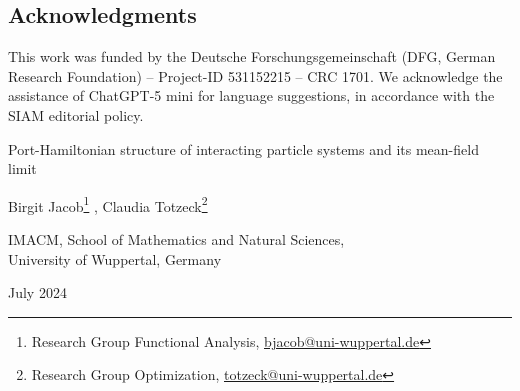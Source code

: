 \documentclass[11pt]{article}
\newcounter{partcounter}
\begin{document}
\begin{bibunit}[unsrtnat]
    \section*{Acknowledgments}
    This work was funded by the Deutsche Forschungsgemeinschaft (DFG, German Research Foundation) – Project-ID 531152215 – CRC 1701. We acknowledge the assistance of ChatGPT-5 mini for language suggestions, in accordance with the SIAM editorial policy. 
        

        \putbib[arxivreferences]
    \end{bibunit}

    \clearpage
\setcounter{page}{1}
\setcounter{section}{0}
\setcounter{equation}{0}
\setcounter{figure}{0}
\setcounter{table}{0}

\begin{center}
    {\LARGE Port-Hamiltonian structure of interacting particle systems and its mean-field limit \par}
    \vspace{0.5cm}
    {\large Birgit Jacob\footnote{Research Group Functional Analysis, \href{mailto:bjacob@uni-wuppertal.de}{bjacob@uni-wuppertal.de}} ,
Claudia Totzeck\footnote{Research Group Optimization, \href{mailto:totzeck@uni-wuppertal.de}{totzeck@uni-wuppertal.de}  } \par}
    \vspace{0.5cm}
    {IMACM, School of Mathematics and Natural Sciences, \\ University of Wuppertal, Germany \par}
    \vspace{0.5cm}
    {July 2024 \par}
\end{center}
\vspace{0.8cm}
\begin{abstract}
We derive a minimal port-Hamiltonian formulation of a general class of interacting particle systems driven by alignment and potential-based force dynamics which include the Cucker-Smale model with potential interaction and the second order Kuramoto model. The port-Hamiltonian structure allows to characterize conserved quantities such as Casimir functions as well as the long-time behaviour using a LaSalle-type argument on the particle level. It is then shown that the port-Hamiltonian structure is preserved in the mean-field limit and an analogue of the LaSalle invariance principle is studied in the space of probability measures equipped with the 2-Wasserstein-metric. The results on the particle and mean-field limit yield a new perspective on uniform stability of general interacting particle systems. Moreover, as the minimal port-Hamiltonian formulation is closed we identify the ports of the subsystems which admit generalized mass-spring-damper structure modelling the binary interaction of two particles. Using the information of ports we discuss the coupling of difference species in a port-Hamiltonian preserving manner.
\end{abstract}
\end{document}

